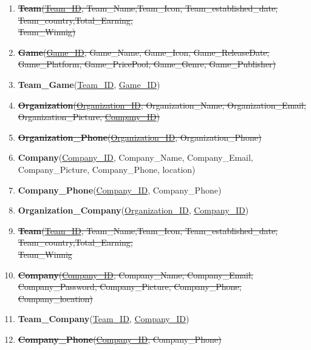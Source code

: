 \begin{enumerate}
    \item \sout{\textbf{Team}(\underline{Team\_ID}, Team\_Name,Team\_Icon, Team\_established\_date, Team\_country,Total\_Earning,\\Team\_Winnig)}
    \item \sout {\textbf{Game}(\underline{Game\_ID}, Game\_Name, Game\_Icon, Game\_ReleaseDate, Game\_Platform, Game\_PricePool, Game\_Genre, Game\_Publisher)}
    \item \textbf{Team\_Game}(\underline{Team\_ID}, \underline{Game\_ID})


    \item \sout{\textbf{Organization}(\underline{Organization\_ID}, Organization\_Name, Organization\_Email, Organization\_Picture, \underline{Company\_ID})}
    \item \sout{\textbf{Organization\_Phone}(\underline{Organization\_ID}, Organization\_Phone)}
    \item \textbf{Company}(\underline{Company\_ID}, Company\_Name, Company\_Email, Company\_Picture, Company\_Phone, location)
    \item \textbf{Company\_Phone}(\underline{Company\_ID}, Company\_Phone)
    \item \textbf{Organization\_Company}(\underline{Organization\_ID}, \underline{Company\_ID})


    \item \sout{\textbf{Team}(\underline{Team\_ID}, Team\_Name,Team\_Icon, Team\_established\_date, Team\_country,Total\_Earning,\\Team\_Winnig}
    \item \sout{\textbf{Company}(\underline{Company\_ID}, Company\_Name, Company\_Email, Company\_Password, Company\_Picture, Company\_Phone, Company\_location)}
    \item \textbf{Team\_Company}(\underline{Team\_ID}, \underline{Company\_ID})
    \item \sout{\textbf{Company\_Phone}(\underline{Company\_ID}, Company\_Phone)}
\end{enumerate}